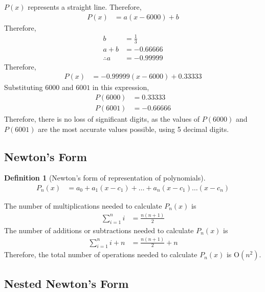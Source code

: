 \documentclass[fleqn, a4paper, 12pt, twoside, titlepage]{article}
\theoremstyle{definition}
\newtheorem{definition}{Definition}
\theoremstyle{theorem}
\begin{document}
\begin{solution}
	$P(x)$ represents a straight line.
	Therefore,
	\begin{align*}
		P(x) &= a (x - 6000) + b
	\end{align*}
	Therefore,
	\begin{align*}
		b &= \frac{1}{3}\\
		a + b &= -0.66666\\
		\therefore a &= -0.99999
	\end{align*}
	Therefore,
	\begin{align*}
		P(x) &= -0.99999 (x - 6000) + 0.33333
	\end{align*}
	Substituting $6000$ and $6001$ in this expression,
	\begin{align*}
		P(6000) &= 0.33333\\
		P(6001) &= -0.66666
	\end{align*}
	Therefore, there is no loss of significant digits, as the values of $P(6000)$ and $P(6001)$ are the most accurate values possible, using 5 decimal digits.
\end{solution}

\subsection{Newton's Form}

\begin{definition}[Newton's form of representation of polynomials]
	\begin{align*}
		P_n(x) &= a_0 + a_1 (x - c_1) + \dots + a_n (x - c_1) \dots (x - c_n)
	\end{align*}
\end{definition}

The number of multiplications needed to calculate $P_n(x)$ is 
\begin{align*}
	\sum\limits_{i = 1}^{n} i &= \frac{n (n + 1)}{2}
\end{align*}
The number of additions or subtractions needed to calculate $P_n(x)$ is 
\begin{align*}
	\sum\limits_{i = 1}^{n} i + n &= \frac{n (n + 1)}{2} + n
\end{align*}
Therefore, the total number of operations needed to calculate $P_n(x)$ is $\mathrm{O}(n^2)$.

\subsection{Nested Newton's Form}
\end{document}
